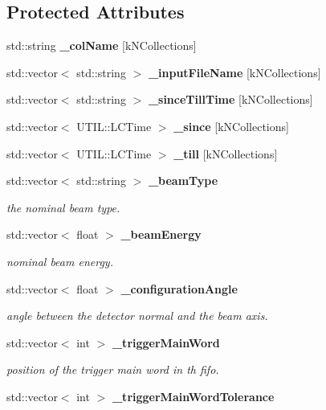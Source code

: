 \subsection*{Protected Attributes}
\begin{DoxyCompactItemize}
\item 
std\-::string {\bfseries \-\_\-col\-Name} [k\-N\-Collections]\label{classmarlin_1_1CaliceConditionsDataCreator_a1c7c2ec9238554a06a8850b0679b66f9}

\item 
std\-::vector$<$ std\-::string $>$ {\bfseries \-\_\-input\-File\-Name} [k\-N\-Collections]\label{classmarlin_1_1CaliceConditionsDataCreator_a91361a635c7673038c4482ad8209f639}

\item 
std\-::vector$<$ std\-::string $>$ {\bfseries \-\_\-since\-Till\-Time} [k\-N\-Collections]\label{classmarlin_1_1CaliceConditionsDataCreator_a5dd2783bec7e29c83911b2c62a5733ea}

\item 
std\-::vector$<$ U\-T\-I\-L\-::\-L\-C\-Time $>$ {\bfseries \-\_\-since} [k\-N\-Collections]\label{classmarlin_1_1CaliceConditionsDataCreator_afb8943272775c52775822d64f0445505}

\item 
std\-::vector$<$ U\-T\-I\-L\-::\-L\-C\-Time $>$ {\bfseries \-\_\-till} [k\-N\-Collections]\label{classmarlin_1_1CaliceConditionsDataCreator_a6c8842188702a4d711ece614f93c0d88}

\item 
std\-::vector$<$ std\-::string $>$ {\bf \-\_\-beam\-Type}
\begin{DoxyCompactList}\small\item\em the nominal beam type. \end{DoxyCompactList}\item 
std\-::vector$<$ float $>$ {\bf \-\_\-beam\-Energy}
\begin{DoxyCompactList}\small\item\em nominal beam energy. \end{DoxyCompactList}\item 
std\-::vector$<$ float $>$ {\bf \-\_\-configuration\-Angle}
\begin{DoxyCompactList}\small\item\em angle between the detector normal and the beam axis. \end{DoxyCompactList}\item 
std\-::vector$<$ int $>$ {\bf \-\_\-trigger\-Main\-Word}
\begin{DoxyCompactList}\small\item\em position of the trigger main word in th fifo. \end{DoxyCompactList}\item 
std\-::vector$<$ int $>$ {\bf \-\_\-trigger\-Main\-Word\-Tolerance}\label{classmarlin_1_1CaliceConditionsDataCreator_ae121828e72a6e69229ea1102e3cacc4c}


\end{DoxyCompactItemize}
